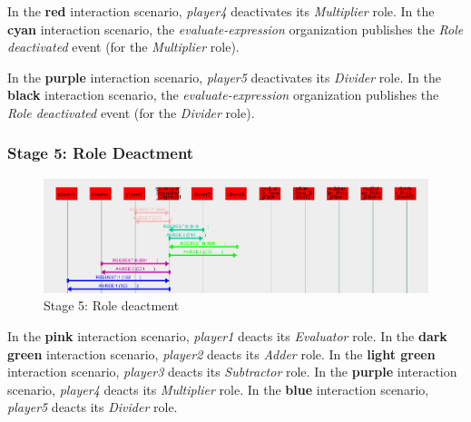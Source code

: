 In the \textbf{red} interaction scenario, \textit{player4} deactivates its \textit{Multiplier} role.
In the \textbf{cyan} interaction scenario, the \textit{evaluate-expression} organization publishes the \textit{Role deactivated} event (for the \textit{Multiplier} role).

In the \textbf{purple} interaction scenario, \textit{player5} deactivates its \textit{Divider} role.
In the \textbf{black} interaction scenario, the \textit{evaluate-expression} organization publishes the \textit{Role deactivated} event (for the \textit{Divider} role).

\subsubsection*{Stage 5: Role Deactment}

\begin{figure}[H]
	\centering
	\includegraphics[width=\textwidth]{images/examples/example2-stage5.png}
	\caption{Stage 5: Role deactment}
	\label{figure:example2-stage5}
\end{figure} 

In the \textbf{pink} interaction scenario, \textit{player1} deacts its \textit{Evaluator} role.
In the \textbf{dark green} interaction scenario, \textit{player2} deacts its \textit{Adder} role.
In the \textbf{light green} interaction scenario, \textit{player3} deacts its \textit{Subtractor} role.
In the \textbf{purple} interaction scenario, \textit{player4} deacts its \textit{Multiplier} role.
In the \textbf{blue} interaction scenario, \textit{player5} deacts its \textit{Divider} role.